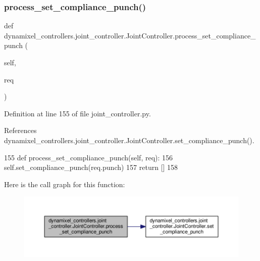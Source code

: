\subsubsection{\texorpdfstring{process\+\_\+set\+\_\+compliance\+\_\+punch()}{process\_set\_compliance\_punch()}}
{\footnotesize\ttfamily def dynamixel\+\_\+controllers.\+joint\+\_\+controller.\+Joint\+Controller.\+process\+\_\+set\+\_\+compliance\+\_\+punch (\begin{DoxyParamCaption}\item[{}]{self,  }\item[{}]{req }\end{DoxyParamCaption})\hspace{0.3cm}{\ttfamily [inherited]}}



Definition at line 155 of file joint\+\_\+controller.\+py.



References dynamixel\+\_\+controllers.\+joint\+\_\+controller.\+Joint\+Controller.\+set\+\_\+compliance\+\_\+punch().


\begin{DoxyCode}
155     \textcolor{keyword}{def }process\_set\_compliance\_punch(self, req):
156         self.set\_compliance\_punch(req.punch)
157         \textcolor{keywordflow}{return} []
158 
\end{DoxyCode}
Here is the call graph for this function\+:
\nopagebreak
\begin{figure}[H]
\begin{center}
\leavevmode
\includegraphics[width=350pt]{d3/dcd/classdynamixel__controllers_1_1joint__controller_1_1_joint_controller_ac3d7aea8d47f24ab10c1162f34cce44f_cgraph}
\end{center}
\end{figure}
\mbox{\label{classdynamixel__controllers_1_1joint__controller_1_1_joint_controller_a6390c0c20afc0581dd3b1122c894d175}} 
